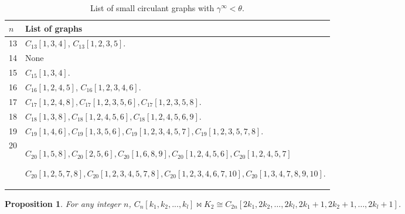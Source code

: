 \documentclass[11pt]{article}
\newtheorem{prop}[thm]{Proposition}
\begin{document}
	\begin{table}[h!]
		\small
		\begin{center}
			\caption{List of small circulant graphs with $\gamma^\infty<\theta$.}
			\label{Table:Circulants}
			\begin{tabular}{|p{0.5cm} || p{13cm}|}
				\hline
				$n$ & List of graphs \\
				\hline
				\hline
				13 & $C_{13}[1, 3, 4]$, $C_{13}[1,2,3,5]$. \\
				\hline
				14 & None \\
				\hline
				15 & $C_{15}[1, 3, 4]$. \\
				\hline
				16 & $C_{16}[1, 2, 4, 5]$, $C_{16}[1, 2, 3, 4, 6]$. \\
				\hline
				17 & $C_{17}[1, 2, 4, 8], C_{17}[1, 2, 3, 5, 6], C_{17}[1, 2, 3, 5, 8]$. \\
				\hline
				18 & $C_{18}[1, 3, 8], C_{18}[1, 2, 4, 5, 6], C_{18}[1, 2, 4, 5, 6, 9]$. \\
				\hline
				19 & $C_{19}[1, 4, 6], C_{19}[1, 3, 5, 6], C_{19}[1, 2, 3, 4, 5, 7], C_{19}[1, 2, 3, 5, 7, 8]$. \\
				\hline
				20 & $C_{20}[1, 5, 8], C_{20}[2, 5, 6], C_{20}[1, 6, 8, 9], C_{20}[1, 2, 4, 5, 6], C_{20}[1, 2, 4, 5, 7]$
				
				$C_{20}[1, 2, 5, 7, 8], C_{20}[1, 2, 3, 4, 5, 7, 8], C_{20}[1, 2, 3, 4, 6, 7, 10], C_{20}[1, 3, 4, 7, 8, 9, 10]$. \\
				\hline
			\end{tabular}
		\end{center}
	\end{table}
	
	\newpage
	\begin{prop} \label{Proposition:BowtieCirculant}
		For any integer $n$, $C_{n}[k_1, k_2, ..., k_l] \bowtie K_2 \cong C_{2n}[2k_1, 2k_2, \ldots, 2k_l, 2k_1+1, 2k_2+1, \ldots, 2k_l+1]$.
	\end{prop}
\end{document}
